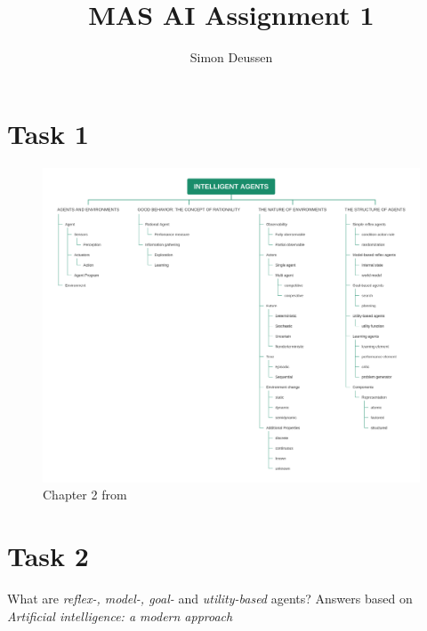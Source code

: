 \documentclass{article}
\title{MAS AI Assignment 1}
\date{}
\author{Simon Deussen}
\begin{document}
  \maketitle

\section*{Task 1}
\begin{figure}[h!]
    \includegraphics[width=\linewidth]{summary.png}
    \caption{Chapter 2 from \cite{russell_norvig_2014}}
    \label{fig:summary}
  \end{figure}
  


\section*{Task 2}
What are  \emph{reflex-, model-, goal-} and \emph{utility-based} agents? Answers based on \emph{Artificial intelligence: a modern approach} \cite{russell_norvig_2014} 
\end{document}
